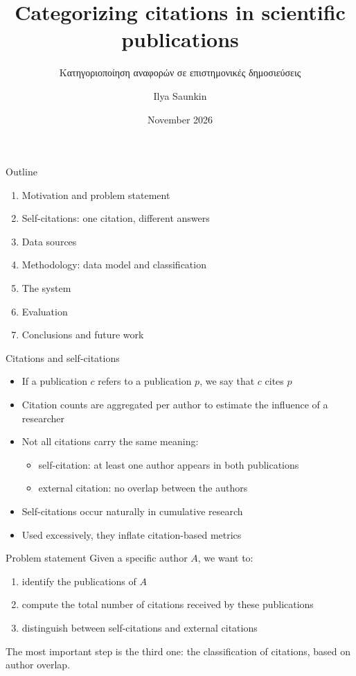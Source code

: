 \documentclass[aspectratio=169,11pt]{beamer}
\title{Categorizing citations in scientific publications}
\subtitle{Κατηγοριοποίηση αναφορών σε επιστημονικές δημοσιεύσεις}
\author{Ilya Saunkin}
\institute{%
  Department of Informatics and Telecommunications, University of Peloponnese\\[1ex]
  \footnotesize Supervisor: Spiros Skiadopoulos\quad Committee: Costas Vassilakis%
}
\date{November 2026}
\begin{document}
\maketitle

\begin{frame}{Outline}
  \begin{enumerate}
    \item Motivation and problem statement
    \item Self-citations: one citation, different answers
    \item Data sources
    \item Methodology: data model and classification
    \item The system
    \item Evaluation
    \item Conclusions and future work
  \end{enumerate}
\end{frame}

\begin{frame}{Citations and self-citations}
  \begin{itemize}
    \item If a publication $c$ refers to a publication $p$, we say that $c$ \alert{cites} $p$
    \item Citation counts are aggregated per author to estimate the influence of a researcher
    \item Not all citations carry the same meaning:
      \begin{itemize}
        \item \alert{self-citation}: at least one author appears in both publications
        \item \alert{external citation}: no overlap between the authors
      \end{itemize}
    \item Self-citations occur naturally in cumulative research
    \item Used excessively, they inflate citation-based metrics
  \end{itemize}
\end{frame}

\begin{frame}{Problem statement}
  Given a specific author $A$, we want to:
  \begin{enumerate}
    \item identify the publications of $A$
    \item compute the total number of citations received by these publications
    \item distinguish between self-citations and external citations
  \end{enumerate}
  \vspace{1em}
  The most important step is the third one: the classification of citations, based on author overlap.
\end{frame}
\end{document}
